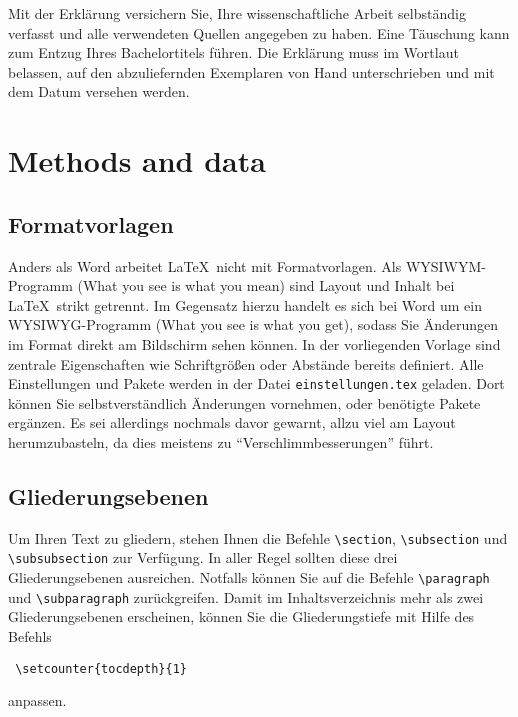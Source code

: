 \documentclass{scrbook}
\begin{document}
Mit der Erklärung versichern Sie, Ihre wissenschaftliche Arbeit selbständig verfasst und alle verwendeten Quellen angegeben zu haben. Eine Täuschung kann zum Entzug Ihres Bachelortitels führen. Die Erklärung muss im Wortlaut belassen, auf den abzuliefernden Exemplaren von Hand unterschrieben und mit dem Datum versehen werden.

\chapter{Methods and data}

\section{Formatvorlagen}
Anders als Word arbeitet \LaTeX\ nicht mit Formatvorlagen. Als WYSIWYM-Programm (What you see is what you mean) sind Layout und Inhalt bei \LaTeX\ strikt getrennt. Im Gegensatz hierzu handelt es sich bei Word um ein WYSIWYG-Programm (What you see is what you get), sodass Sie Änderungen im Format direkt am Bildschirm sehen können.
In der vorliegenden Vorlage sind zentrale Eigenschaften wie Schriftgrößen oder Abstände bereits definiert. Alle Einstellungen und Pakete werden in der Datei \texttt{einstellungen.tex} geladen. Dort können Sie selbstverständlich Änderungen vornehmen, oder benötigte Pakete ergänzen. Es sei allerdings nochmals davor gewarnt, allzu viel am Layout herumzubasteln, da dies meistens zu "`Verschlimmbesserungen"' führt. 

\section{Gliederungsebenen}
Um Ihren Text zu gliedern, stehen Ihnen die Befehle \verb|\section|, \verb|\subsection| und \verb|\subsubsection| zur Verfügung. In aller Regel sollten diese drei Gliederungsebenen ausreichen. Notfalls können Sie auf die Befehle \verb|\paragraph| und \verb|\subparagraph| zurückgreifen. Damit im Inhaltsverzeichnis mehr als zwei Gliederungsebenen erscheinen, können Sie die Gliederungstiefe mit Hilfe des Befehls \begin {verbatim} \setcounter{tocdepth}{1} \end{verbatim} anpassen. 
\end{document}
